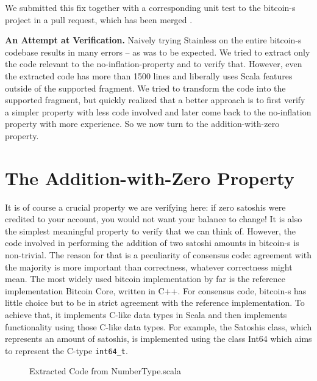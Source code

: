 \documentclass[runningheads]{llncs}
\renewcommand{\paragraph}{\textbf}%
\begin{document}
We submitted this fix together with a corresponding unit test to the
bitcoin-s project in a pull request, which has been merged
\cite{BitcoinS:pull435}.


\paragraph{An Attempt at Verification.} Naively trying Stainless on
the entire bitcoin-s codebase results in many errors -- as was to be
expected. We tried to extract only the code relevant to the
no-inflation-property and to verify that. However, even the extracted
code has more than 1500 lines and liberally uses Scala features
outside of the supported fragment. We tried to transform the code
into the supported fragment, but quickly realized that a better
approach is to first verify a simpler property with less code involved
and later come back to the no-inflation property with more
experience. So we now turn to the addition-with-zero property.




\section{The Addition-with-Zero Property}

It is of course a crucial property we are verifying here: if zero
satoshis were credited to your account, you would not want your
balance to change! It is also the simplest meaningful property to
verify that we can think of. However, the code involved in performing
the addition of two satoshi amounts in bitcoin-s is non-trivial. The
reason for that is a peculiarity of consensus code: agreement with the
majority is more important than correctness, whatever correctness
might mean. The most widely used bitcoin implementation by far is the
reference implementation Bitcoin Core, written in C++. For consensus
code, bitcoin-s has little choice but to be in strict agreement with
the reference implementation. To achieve that, it implements C-like
data types in Scala and then implements functionality using those
C-like data types. For example, the Satoshis class, which represents
an amount of satoshis, is implemented using the class Int64 which
aims to represent the C-type \texttt{int64\_t}.

\begin{figure}

  \caption{Extracted Code from NumberType.scala}
  \label{fig:numbertype}
\end{figure}
\end{document}
